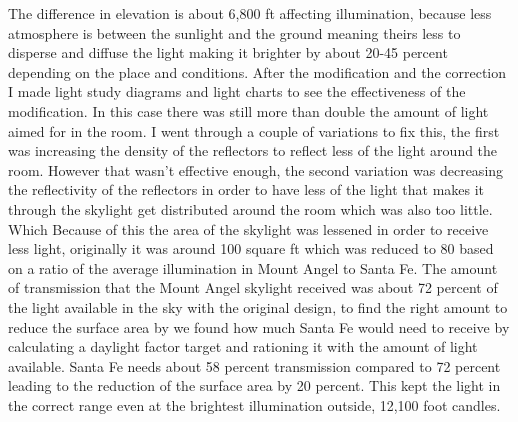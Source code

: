 \documentclass{article}
\begin{document}
The difference in elevation is about 6,800 ft affecting illumination, because less atmosphere is between the sunlight and the ground meaning theirs less to disperse and diffuse the light making it brighter by about 20-45 percent  depending on the place and conditions. After the modification and the correction I made light study diagrams and light charts to see the effectiveness of the modification. In this case there was still  more than double the amount of light aimed for in the room. I went through a couple of variations to fix this, the first was increasing the density of the reflectors to reflect less of the light around the room. However that wasn't effective enough, the second variation was decreasing the reflectivity of the reflectors in order to have less of the light that makes it through the skylight get distributed around the room which was also too little.  Which Because of this the area of the skylight was lessened in order to receive less light, originally it was around 100 square ft which was reduced to 80 based on a ratio of the average illumination in Mount Angel to Santa Fe.  The amount of transmission  that the Mount Angel skylight received was about 72 percent of the light available in the sky with the original design, to find the right amount to reduce the surface area by we found how much Santa Fe would need to receive by calculating a daylight factor target and rationing it with the amount of light available. Santa Fe needs about 58 percent transmission compared to 72 percent leading to the reduction of the surface area by 20 percent. This kept the light in the correct range even at the brightest illumination outside, 12,100 foot candles. 
\end{document}
